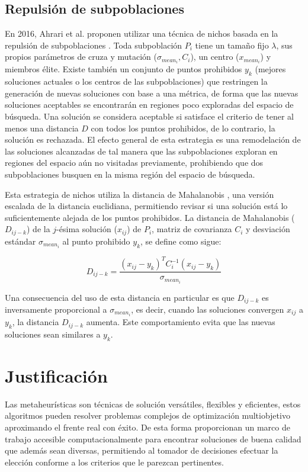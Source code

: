 \documentclass[letterpaper,10pt]{article}
\begin{document}
\subsection{Repulsión de subpoblaciones}

En 2016, Ahrari et al. proponen utilizar una técnica de nichos basada en la repulsión de subpoblaciones \cite{ahrari2016multimodal}. Toda subpoblación $P_i$ tiene un tamaño fijo $\lambda$,
sus propios parámetros de cruza y mutación ($\sigma_{mean_i},C_i$), un centro ($x_{mean_i}$) y miembros élite. Existe también un conjunto de puntos prohibidos $y_k$
(mejores soluciones actuales o los centros de las subpoblaciones) que restringen la generación de nuevas soluciones con base a una métrica, de forma que las nuevas soluciones aceptables
se encontrarán en regiones poco exploradas del espacio de búsqueda. Una solución se considera aceptable si satisface el criterio de tener al menos una distancia $D$ con todos los puntos prohibidos, de lo contrario,
la solución es rechazada. El efecto general de esta estrategia es una remodelación de las soluciones alcanzadas de tal manera que las subpoblaciones exploran en regiones del espacio
aún no visitadas previamente, prohibiendo que dos subpoblaciones busquen en la misma región del espacio de búsqueda.
\newline

Esta estrategia de nichos utiliza la distancia de Mahalanobis \cite{mahalanobis1936generalised}, una versión escalada de la distancia euclidiana, permitiendo revisar si una solución está lo suficientemente
alejada de los puntos prohibidos. La distancia de Mahalanobis ($D_{ij-k}$) de la $j$-ésima solución ($x_{ij}$) de $P_i$, matriz de covarianza $C_i$ y desviación estándar $\sigma_{mean_i}$ al punto prohibido
$y_k$, se define como sigue:

$$D_{ij-k} = \frac{(x_{ij}-y_k)^T C^{-1}_i (x_{ij}-y_k)}{\sigma_{mean_i}}$$

Una consecuencia del uso de esta distancia en particular es que $D_{ij-k}$ es inversamente proporcional a $\sigma_{mean_i}$, es decir, cuando las soluciones convergen $x_{ij}$ a $y_k$,
la distancia $D_{ij-k}$ aumenta. Este comportamiento evita que las nuevas soluciones sean similares a $y_k$.



\section{Justificación}

Las metaheurísticas son técnicas de solución versátiles, flexibles y eficientes, estos algoritmos pueden resolver problemas complejos de optimización multiobjetivo \cite{coello1999comprehensive} aproximando el frente real con éxito. 
De esta forma proporcionan un marco de trabajo accesible computacionalmente para encontrar soluciones de buena calidad que además sean diversas, permitiendo al tomador de decisiones efectuar la elección conforme a los criterios que le parezcan pertinentes.
\newline
\end{document}
